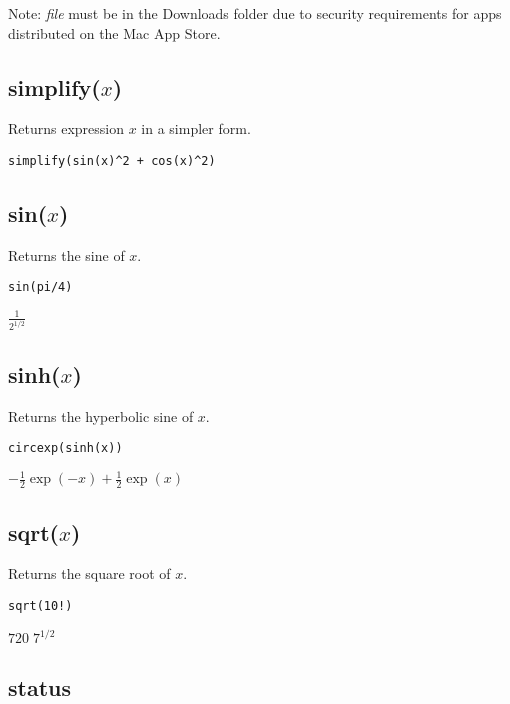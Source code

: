 \noindent
Note: {\it file} must be in the Downloads folder due to security requirements for apps distributed on the Mac App Store.

\subsection*{simplify($x$)}

Returns expression $x$ in a simpler form.

{\color{blue}
\begin{verbatim}
simplify(sin(x)^2 + cos(x)^2)
\end{verbatim}
}


\subsection*{sin($x$)}

Returns the sine of $x$.

{\color{blue}
\begin{verbatim}
sin(pi/4)
\end{verbatim}
}

\noindent
$\displaystyle \frac{1}{2^{1/2}}$

\subsection*{sinh($x$)}

Returns the hyperbolic sine of $x$.

{\color{blue}
\begin{verbatim}
circexp(sinh(x))
\end{verbatim}
}

\noindent
$\displaystyle -\tfrac{1}{2}\exp(-x)+\tfrac{1}{2}\exp(x)$

\subsection*{sqrt($x$)}

Returns the square root of $x$.

{\color{blue}
\begin{verbatim}
sqrt(10!)
\end{verbatim}
}

\noindent
$\displaystyle 720\; 7^{1/2}$

\subsection*{status}

